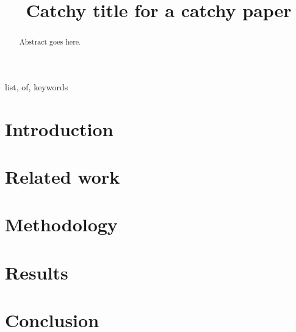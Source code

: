 \documentclass[conference]{IEEEtran}
\begin{document}
\title{Catchy title for a catchy paper}


\author{
}

\maketitle

\begin{abstract}
    Abstract goes here. 
\end{abstract}

\begin{IEEEkeywords}
list, of, keywords
\end{IEEEkeywords}


\section{Introduction}
\label{sec:intro}

\section{Related work}
\label{sec:related}

\section{Methodology}
\label{sec:methodology}

\section{Results}
\label{sec:results}

\section{Conclusion}
\label{sec:conclusion}


\end{document}
